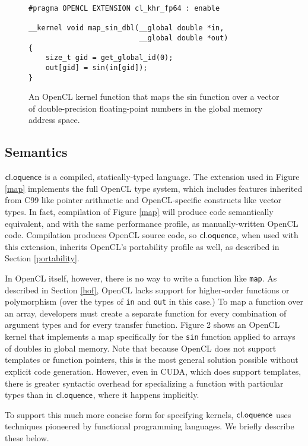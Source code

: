 \documentclass[10pt, conference, compsocconf]{IEEEtran}
\begin{document}
\begin{figure}
\small{\begin{verbatim}
#pragma OPENCL EXTENSION cl_khr_fp64 : enable

__kernel void map_sin_dbl(__global double *in, 
                          __global double *out) 
{
    size_t gid = get_global_id(0);
    out[gid] = sin(in[gid]);
}
\end{verbatim}}
\caption{An OpenCL kernel function that maps the sin function over a vector of double-precision floating-point numbers in the global memory address space.}
\label{mapsinint}
\end{figure}

\subsection{Semantics}
$\textsf{cl.oquence}$ is a compiled, statically-typed language. The extension used in Figure \ref{map} implements the full OpenCL type system, which includes features inherited from C99 like pointer arithmetic and OpenCL-specific constructs like vector types. In fact, compilation of Figure \ref{map} will produce code semantically equivalent, and with the same performance profile, as manually-written OpenCL code. Compilation produces OpenCL source code, so $\textsf{cl.oquence}$, when used with this extension, inherits OpenCL's portability profile as well, as described in Section \ref{portability}.

In OpenCL itself, however, there is no way to write a function like \verb|map|. As described in Section \ref{hof}, OpenCL lacks support for higher-order functions or polymorphism (over the types of \verb|in| and \verb|out| in this case.) To map a function over an array, developers must create a separate function for every combination of argument types and for every transfer function. Figure 2 shows an OpenCL kernel that implements a map specifically for the \verb|sin| function applied to arrays of doubles in global memory. Note that because OpenCL does not support templates or function pointers, this is the most general solution possible without explicit code generation. However, even in CUDA, which does support templates, there is greater syntactic overhead for specializing a function with particular types than in $\textsf{cl.oquence}$, where it happens implicitly.

To support this much more concise form for specifying kernels, $\textsf{cl.oquence}$ uses techniques pioneered by functional programming languages. We briefly describe these below.
\end{document}

